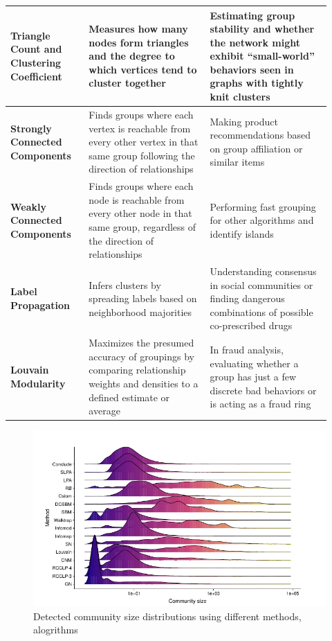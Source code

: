 \begin{center}
\begin{longtable}{p{0.22\linewidth}p{0.3475\linewidth}p{0.3475\linewidth}}
		\textbf{Triangle Count and Clu\-s\-ter\-ing Coefficient} & Measures how many nodes form triangles and the degree to which vertices tend to cluster together & Estimating group stability and whether the network might exhibit “small-world” behaviors seen in graphs with tightly knit clusters\\
		\hline
		\textbf{Strongly Con\-nec\-t\-ed Com\-po\-nents} & Finds groups where each vertex is reachable from every other vertex in that same group following the direction of relationships & Making product recommendations based on group affiliation or similar items\\
		\hline
		\textbf{Weakly Connected Com\-po\-nents} & Finds groups where each node is reachable from every other node in that same group, regardless of the direction of relationships & Performing fast grouping for other algorithms and identify islands\\
		\hline
		\textbf{Label Propagation} & Infers clusters by spreading labels based on neighborhood majorities & Understanding consensus in social communities or finding dangerous combinations of possible co-prescribed drugs\\
		\hline
		\textbf{Louvain Modularity} & Maximizes the presumed accuracy of groupings by comparing relationship weights and densities to a defined estimate or average & In fraud analysis, evaluating whether a group has just a few discrete bad behaviors or is acting as a fraud ring\\
		\hline
	\end{longtable}
	\vspace*{-1.35cm}
\end{center}

\begin{figure}[H]%
	\centering%
	\includegraphics[width=1\textwidth-4pt,%
		bgcolor=white,%
		cfbox=lightestgray %
			  2pt %
			  0pt %
			  0pt %
	]{images/chapter3/DaoBothorelLenca2020methodscommunitysizepage27.pdf}%
	\caption[Detected community size distributions using different methods, alogrithms]{Detected \gls{community size} distributions using different methods, alogrithms}%
	\label{fig:DaoBothorelLenca2020methodscommunitysizepage27}%
\end{figure}%

